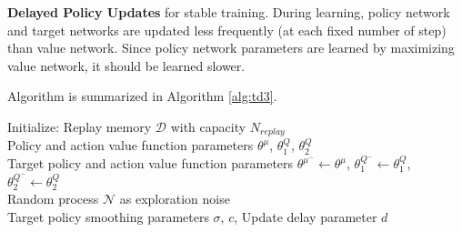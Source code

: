 \textbf{Delayed Policy Updates} for stable training. 
During learning, policy network and target networks are updated less frequently (at each fixed number of step) than value network. 
Since policy network parameters are learned by maximizing value network, it should be learned slower. 

Algorithm is summarized in Algorithm \ref{alg:td3}. 
\begin{algorithm}
	\SetAlgoLined
	\DontPrintSemicolon %
	Initialize: Replay memory $\mathcal{D}$ with capacity $N_{replay}$ \\
	Policy and action value function parameters $\theta^{\mu}$, $\theta^Q_1$, $\theta^Q_2$  \\
	Target policy and action value function parameters $\theta^{\mu^-} \leftarrow \theta^{\mu}$, $\theta^{Q^-}_1 \leftarrow \theta^{Q}_1$, $\theta^{Q^-}_2 \leftarrow \theta^{Q}_2$ \\
	Random process $\mathcal{N}$ as exploration noise \\
	Target policy smoothing parameters $\sigma$, $c$, Update delay parameter $d$ \\
\end{algorithm}
